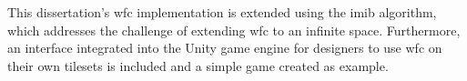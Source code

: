 This dissertation's \acrshort{wfc} implementation is extended using the \acrfull{imib} algorithm, which addresses the challenge of extending \acrshort{wfc} to an infinite space. Furthermore, an interface integrated into the Unity game engine for designers to use \acrshort{wfc} on their own tilesets is included and a simple game created as example.

\begin{figure}[H]
    \centering
    \hfill

    \vspace{\baselineskip} %


\end{figure}
